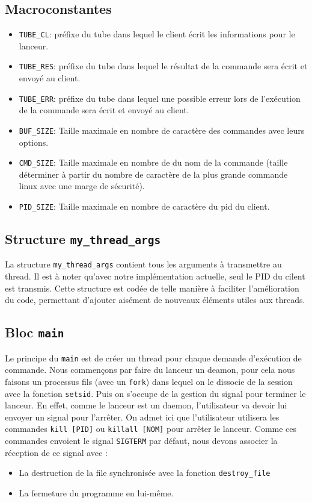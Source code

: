 \documentclass[12pt]{article}
\begin{document}
\subsection{Macroconstantes}
\begin{itemize}
    \item \texttt{TUBE\_CL}: préfixe du tube dans lequel le client écrit
          les
          informations pour le lanceur.
    \item \texttt{TUBE\_RES}: préfixe du tube dans lequel le résultat de la
          commande sera écrit et envoyé au client.
    \item \texttt{TUBE\_ERR}: préfixe du tube dans lequel une possible
          erreur
          lors de l'exécution de la commande sera écrit et envoyé au client.
    \item \texttt{BUF\_SIZE}: Taille maximale en nombre de caractère des
          commandes
          avec leurs options.
    \item \texttt{CMD\_SIZE}: Taille maximale en nombre de du nom de la
          commande
          (taille déterminer à partir du nombre de caractère de la plus
          grande commande linux avec une marge de sécurité).
    \item \texttt{PID\_SIZE}: Taille maximale en nombre de caractère du pid
          du client.
\end{itemize}

\subsection{Structure \texttt{my\_thread\_args}}
La structure \texttt{my\_thread\_args} contient tous les arguments à
transmettre au thread.
Il est à noter qu'avec notre implémentation actuelle, seul le PID du cilent
est transmis. Cette structure est codée de telle manière à faciliter
l'amélioration du code, permettant d'ajouter aisément de nouveaux éléments
utiles aux threads.

\subsection{Bloc \texttt{main}}
Le principe du \texttt{main} est de créer un thread pour chaque demande
d'exécution de
commande.
Nous commençons par faire du lanceur un deamon, pour cela nous faisons un
processus fils (avec un \texttt{fork}) dans lequel on le dissocie de la session
avec la fonction \texttt{setsid}.
Puis on s'occupe de la gestion du signal pour terminer le lanceur. En
effet, comme le lanceur est un daemon, l'utilisateur va devoir lui envoyer un
signal pour l'arrêter. On admet ici que l'utilisateur utilisera les commandes
\texttt{kill  [PID]} ou \texttt{killall [NOM]} pour arrêter le lanceur. Comme
ces commandes envoient le signal \texttt{SIGTERM} par défaut, nous devons
associer la réception de ce signal avec :
\begin{itemize}
    \item La destruction de la file synchronisée avec la fonction
          \texttt{destroy\_file}
    \item La fermeture du programme en lui-même.
\end{itemize}
\end{document}
